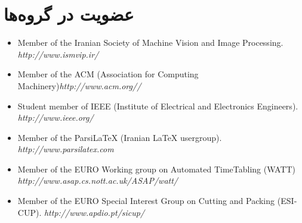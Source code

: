\documentclass[11pt,a4paper]{bidimoderncv}
\begin{document}
\section{عضویت در گروه‌ها}
\begin{latin}
\small
\begin{itemize}%
\item Member of the Iranian Society of Machine Vision and Image Processing.	\hfill {\scriptsize\em http://www.ismvip.ir/}
\item Member of the ACM (Association for Computing Machinery)\hfill {\scriptsize\em http://www.acm.org//}
\item Student member of IEEE (Institute of Electrical and Electronics Engineers). \hfill {\scriptsize\em http://www.ieee.org/}
\item Member of the ParsiLaTeX (Iranian \LaTeX{} usergroup). \hfill {\scriptsize\em http://www.parsilatex.com}
\item Member of the EURO Working group on Automated TimeTabling (WATT) \hfill {\scriptsize\em http://www.asap.cs.nott.ac.uk/ASAP/watt/}
\item Member of the EURO Special Interest Group on Cutting and Packing (ESICUP). \hfill {\scriptsize\em http://www.apdio.pt/sicup/}
\end{itemize}	
\end{latin}
\end{document}
